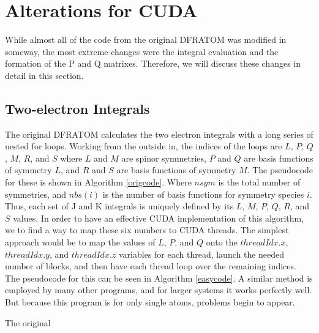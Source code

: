 \documentclass[12pt]{book}
\begin{document}
\section{Alterations for CUDA}
While almost all of the code from the original DFRATOM was modified in someway, the most extreme changes were the integral evaluation and the formation of the P and Q matrixes. Therefore, we will discuss these changes in detail in this section.

\subsection{Two-electron Integrals}
The original DFRATOM calculates the two electron integrals with a long series of nested for loops. Working from the outside in, the indices of the loops are $L$, $P$, $Q$, $M$, $R$, and $S$ where $L$ and $M$ are spinor symmetries, $P$ and $Q$ are basis functions of symmetry $L$, and $R$ and $S$ are basis functions of symmetry $M$. The pseudocode for these is shown in Algorithm \ref{origcode}. Where $nsym$ is the total number of symmetries, and $nbs(i)$ is the number of basis functions for symmetry species $i$. Thus, each set of J and K integrals is uniquely defined by its $L$, $M$, $P$, $Q$, $R$, and $S$ values. In order to have an effective CUDA implementation of this algorithm, we to find a way to map these six numbers to CUDA threads. The simplest approach would be to map the values of $L$, $P$, and $Q$ onto the $threadIdx.x$, $threadIdx.y$, and $threadIdx.z$ variables for each thread, launch the needed number of blocks, and then have each thread loop over the remaining indices. The pseudocode for this can be seen in Algorithm \ref{easycode}. A similar method is employed by many other programs, and for larger systems it works perfectly well. But because this program is for only single atoms, problems begin to appear.

\begin{algorithm}
\caption{The original }
\label{origcode}
\begin{algorithmic}
				\ELSE
				\ENDIF
					\ELSE
					\ENDIF
					\ENDFOR
				\ENDFOR
			\ENDFOR
		\ENDFOR
	\ENDFOR
\ENDFOR
\end{algorithmic}
\end{algorithm}
\end{document}
